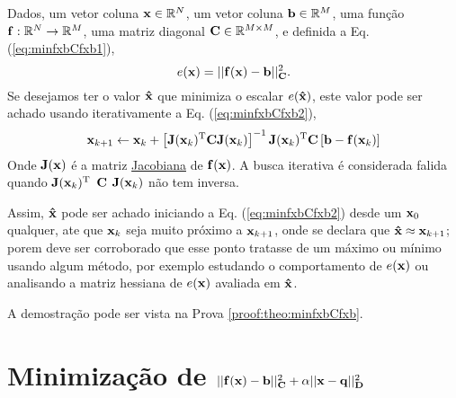 \begin{theorem}\label{theo:minfxbCfxb}
Dados,
um vetor coluna $\VECTOR{x}\in \mathbb{R}^N$, 
um vetor coluna $\VECTOR{b}\in \mathbb{R}^M$,  
uma função $\VECTOR{f}:\mathbb{R}^{N} \rightarrow \mathbb{R}^{M}$, 
uma matriz diagonal $\MATRIX{C} \in \mathbb{R}^{M\times M}$, e 
definida a Eq. (\ref{eq:minfxbCfxb1}),
\begin{equation}\label{eq:minfxbCfxb1}
e(\VECTOR{x})=||\VECTOR{f}(\VECTOR{x})-\VECTOR{b}||_{\MATRIX{C}}^2.
\end{equation}
Se desejamos ter o valor $\VECTOR{\hat{x}}$ que minimiza o escalar $e(\VECTOR{\hat{x}})$,
este valor pode ser achado usando iterativamente a Eq. (\ref{eq:minfxbCfxb2}),
\begin{equation}\label{eq:minfxbCfxb2}
\VECTOR{x}_{k+1} \leftarrow \VECTOR{x}_k+
\left[ \MATRIX{J}(\VECTOR{x}_k)^{\transpose}\MATRIX{C} \MATRIX{J}(\VECTOR{x}_k) \right]^{-1}
 \MATRIX{J}(\VECTOR{x}_k)^{\transpose}\MATRIX{C}\left[\VECTOR{b}-\VECTOR{f}(\VECTOR{x}_k)\right]
\end{equation}
Onde  $\MATRIX{J}(\VECTOR{x})$ é a matriz \hyperref[def:jacobian]{Jacobiana} \cite{Jacobian} de $\VECTOR{f}(\VECTOR{x})$.
A busca iterativa é considerada falida quando 
$\MATRIX{J}(\VECTOR{x}_k)^{\transpose}$ $\MATRIX{C}$ $\MATRIX{J}(\VECTOR{x}_k)$
não tem inversa.

Assim, $\VECTOR{\hat{x}}$ pode ser achado iniciando a Eq. (\ref{eq:minfxbCfxb2}) desde um $\VECTOR{x}_{0}$ qualquer, ate que $\VECTOR{x}_{k}$ seja muito próximo a $\VECTOR{x}_{k+1}$,
onde se declara que $\VECTOR{\hat{x}} \approx \VECTOR{x}_{k+1}$; porem deve ser corroborado
que esse ponto tratasse de um máximo ou mínimo usando algum método, por exemplo estudando o comportamento 
de $e(\VECTOR{x})$ ou analisando a matriz hessiana de $e(\VECTOR{x})$ avaliada em $\VECTOR{\hat{x}}$.

A demostração pode ser vista na Prova \ref{proof:theo:minfxbCfxb}.
\end{theorem}



\section{Minimização de $||\VECTOR{f}(\VECTOR{x})-\VECTOR{b}||_{\MATRIX{C}}^2+\alpha||\VECTOR{x}-\VECTOR{q}||_{\MATRIX{D}}^2$  
}

